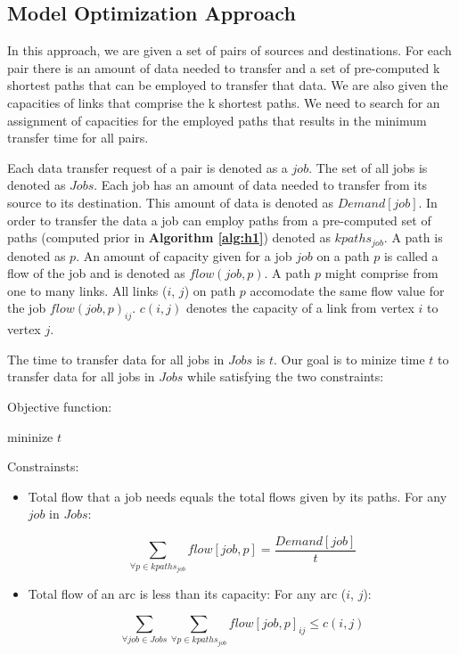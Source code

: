 \subsection{Model Optimization Approach}
\label{sec:optimization}

In this approach, we are given a set of pairs of sources and destinations. For each pair there is an amount of data needed to transfer and a set of pre-computed k shortest paths that can be employed to transfer that data. We are also given the capacities of links that comprise the k shortest paths. We need to search for an assignment of capacities for the employed paths that results in the minimum transfer time for all pairs. 

Each data transfer request of a pair is denoted as a $job$. The set of all jobs is denoted as $Jobs$. Each job has an amount of data needed to transfer from its source to its destination. This amount of data is denoted as $Demand[job]$. In order to transfer the data a job can employ paths from a pre-computed set of paths (computed prior in \textbf{Algorithm \ref{alg:h1}}) denoted as $kpaths_{job}$. A path is denoted as $p$. An amount of capacity given for a job $job$ on a path $p$ is called a flow of the job and is denoted as $flow(job, p)$. A path $p$ might comprise from one to many links. All links ($i$, $j$) on path $p$ accomodate the same flow value for the job $flow(job, p)_{ij}$. $c(i,j)$ denotes the capacity of a link from vertex $i$ to vertex $j$.

The time to transfer data for all jobs in $Jobs$ is $t$. Our goal is to minize time $t$ to transfer data for all jobs in $Jobs$ while satisfying the two constraints:

Objective function:

\begin{center}
mininize $t$
\end{center}

Constrainsts:
\begin{itemize}

\item Total flow that a job needs equals the total flows given by its paths. For any $job$ in $Jobs$: 

\begin{equation} 
\label{eq:jobflow}
\sum_{\forall p \in kpaths_{job}} flow[job, p]  = \frac{Demand[job]}{t}
\end{equation}

\item Total flow of an arc is less than its capacity: For any arc ($i$, $j$):

\begin{equation} 
\label{eq:linkcapacity}
\sum_{\forall job \in Jobs}\sum_{\forall p \in kpaths_{job}} flow[job, p]_{ij} \leq c(i, j)
\end{equation}

\end{itemize}

